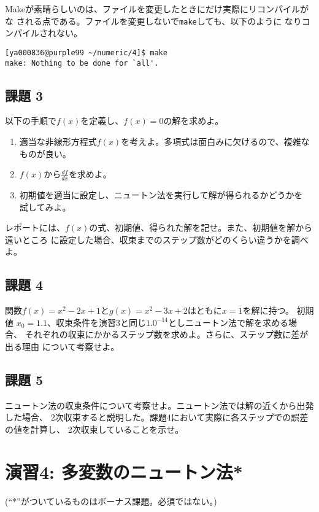 \documentclass[a4paper]{jsarticle}
\begin{document}
Makeが素晴らしいのは、ファイルを変更したときにだけ実際にリコンパイルがな
される点である。ファイルを変更しないで\texttt{make}しても、以下のように
なりコンパイルされない。
\begin{lstlisting}
[ya000836@purple99 ~/numeric/4]$ make
make: Nothing to be done for `all'.
\end{lstlisting}

\subsection*{課題 3}
以下の手順で$f(x)$を定義し、$f(x)=0$の解を求めよ。
\begin{enumerate}
 \item 適当な非線形方程式$f(x)$を考えよ。多項式は面白みに欠けるので、複雑なものが良い。
 \item $f(x)$から$\displaystyle\frac{df}{dx}$を求めよ。
 \item 初期値を適当に設定し、ニュートン法を実行して解が得られるかどうかを
       試してみよ。
\end{enumerate}

レポートには、$f(x)$の式、初期値、得られた解を記せ。また、初期値を解から遠いところ
に設定した場合、収束までのステップ数がどのくらい違うかを調べよ。

\subsection*{課題 4}

関数$f(x) = x^{2} - 2x + 1$と$g(x) = x^{2} - 3x + 2$はともに$x = 1$を解に持つ。
初期値 $x_{0} = 1.1$、収束条件を演習3と同じ$1.0^{-14}$としニュートン法で解を求める場合、
それぞれの収束にかかるステップ数を求めよ。さらに、ステップ数に差が出る理由
について考察せよ。

\subsection*{課題 5}

ニュートン法の収束条件について考察せよ。ニュートン法では解の近くから出発した場合、
2次収束すると説明した。課題4において実際に各ステップでの誤差の値を計算し、
2次収束していることを示せ。

\section*{演習4: 多変数のニュートン法*}

\noindent
(``*''がついているものはボーナス課題。必須ではない。)
\end{document}
